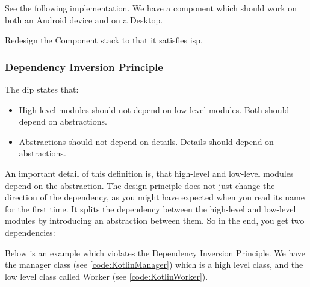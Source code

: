 See the following implementation. We have a component which should work on both an Android device and on a Desktop. 







\begin{exercise}
	Redesign the Component stack to that it satisfies \gls{isp}.
\end{exercise}


\subsubsection{Dependency Inversion Principle}

\begin{framed}
	The \gls{dip} states that:
	\begin{itemize}
		\item High-level modules should not depend on low-level modules. Both should depend on abstractions.
		\item Abstractions should not depend on details. Details should depend on abstractions.
	\end{itemize}
\end{framed}

An important detail of this definition is, that high-level and low-level modules depend on the abstraction. The design principle does not just change the direction of the dependency, as you might have expected when you read its name for the first time. It splits the dependency between the high-level and low-level modules by introducing an abstraction between them. So in the end, you get two dependencies:

Below is an example which violates the Dependency Inversion Principle. We have the manager class  (see \ref{code:KotlinManager}) which is a high level class, and the low level class called Worker (see \ref{code:KotlinWorker}).





